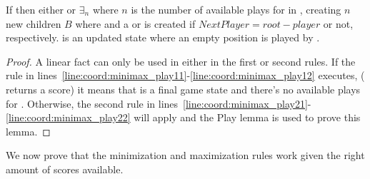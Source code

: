 \begin{lemma}
If  then either  or $\exists_n$ where $n$ is the number of available plays for
 in , creating $n$ new children $B$ where  and a  or  is created if
         $NextPlayer = root-player$ or not, respectively.  is an
         updated  state where an empty position is played by
         .
\end{lemma}
\begin{proof}

A linear fact  can only be used
in either in the first or second rules.
If the rule in
lines~\ref{line:coord:minimax_play11}-\ref{line:coord:minimax_play12} executes,
( returns a score) it means that  is a final
game state and there's no available plays for .
Otherwise, the second rule in
lines~\ref{line:coord:minimax_play21}-\ref{line:coord:minimax_play22} will
apply and the Play lemma is used to prove this lemma.

\end{proof}

We now prove that the minimization and maximization rules work given the right
amount of scores available.

